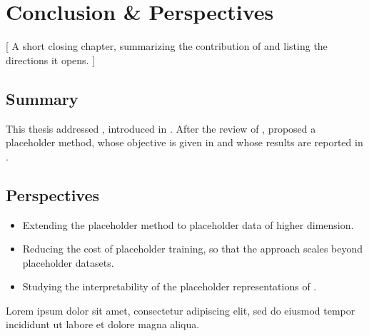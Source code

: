 \chapter[phd_conclusion]{Conclusion \& Perspectives}
 [
  A short closing chapter, summarizing the contribution of  and listing the directions it opens.
 ]

\section[phd_conclusion_summary]{Summary}

This thesis addressed , introduced in .
After the review of ,  proposed a placeholder method, whose objective is given in  and whose results are reported in .

\section[phd_conclusion_perspectives]{Perspectives}

\begin{itemize}
    \item Extending the placeholder method to placeholder data of higher dimension.
    \item Reducing the  cost of placeholder training, so that the approach scales beyond placeholder datasets.
    \item Studying the interpretability of the placeholder representations of .
\end{itemize}

Lorem ipsum dolor sit amet, consectetur adipiscing elit, sed do eiusmod tempor incididunt ut labore et dolore magna aliqua.
